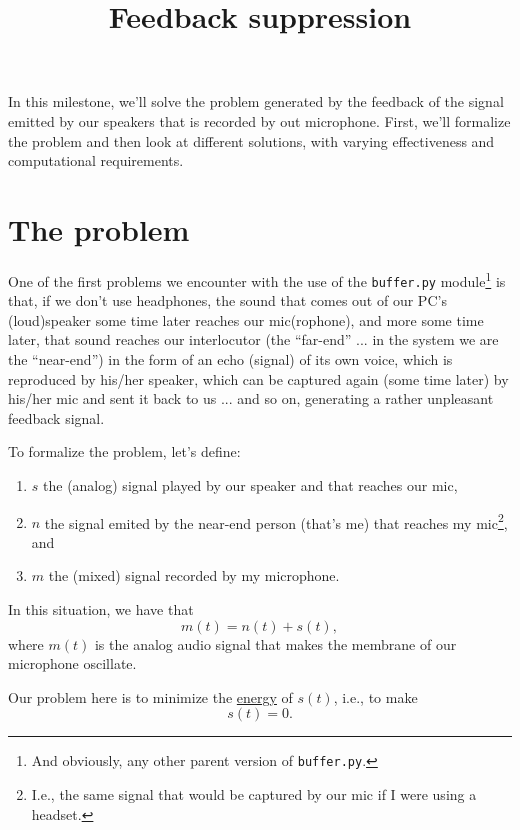 
\title{Feedback suppression}

\maketitle

In this milestone, we'll solve the problem generated by the feedback
of the signal emitted by our speakers that is recorded by out
microphone. First, we'll formalize the problem and then look at
different solutions, with varying effectiveness and computational
requirements.

\section{The problem}

One of the first problems we encounter with the use of the
\texttt{buffer.py} module\footnote{And obviously, any other parent
  version of \texttt{buffer.py}.} is that, if we don't use headphones,
the sound that comes out of our PC's (loud)speaker some time later reaches
our mic(rophone), and more some time later, that sound reaches our
interlocutor (the ``far-end'' ... in the system we are the
``near-end'') in the form of an echo (signal) of its own voice, which
is reproduced by his/her speaker, which can be captured again (some
time later) by his/her mic and sent it back to us ... and so on,
generating a rather unpleasant feedback signal.

To formalize the problem, let's define:
\begin{enumerate}
\item $s$ the (analog) signal played by our
  speaker and that reaches our mic,
\item $n$ the signal emited by
  the near-end person (that's me) that reaches my mic\footnote{I.e.,
  the same signal that would be captured by our mic if I were using a
  headset.}, and
\item $m$ the (mixed) signal recorded by my microphone.
\end{enumerate}
In this situation, we have that
\begin{equation}
  m(t) = n(t) + s(t),
  \label{eq:echo_problem}
\end{equation}
where $m(t)$ is the analog audio signal that makes the membrane of our
microphone oscillate.

Our problem here is to minimize the
\href{https://en.wikipedia.org/wiki/Energy_(signal_processing)}{energy}
of $s(t)$, i.e., to make
\begin{equation}
  s(t) = 0.
\end{equation}

